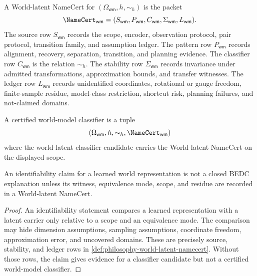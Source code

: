 \begin{definition}
\label{def:philosophy-world-latent-namecert}
A World-latent NameCert for $(\Omega_{\mathsf{wm}},h,\sim_h)$ is the
packet
$$
\NameCert_{\mathsf{wm}}
=
(S_{\mathsf{wm}},
P_{\mathsf{wm}},
C_{\mathsf{wm}},
\Sigma_{\mathsf{wm}},
L_{\mathsf{wm}}).
$$
The source row $S_{\mathsf{wm}}$ records the scope, encoder, observation
protocol, pair protocol, transition family, and assumption ledger. The
pattern row $P_{\mathsf{wm}}$ records alignment, recovery, separation,
transition, and planning evidence. The classifier row $C_{\mathsf{wm}}$
is the relation $\sim_h$. The stability row $\Sigma_{\mathsf{wm}}$
records invariance under admitted transformations, approximation bounds,
and transfer witnesses. The ledger row $L_{\mathsf{wm}}$ records
unidentified coordinates, rotational or gauge freedom, finite-sample
residue, model-class restriction, shortcut risk, planning failures, and
not-claimed domains.
\end{definition}

\begin{definition}
\label{def:philosophy-certified-world-model-classifier}
A certified world-model classifier is a tuple
$$
(\Omega_{\mathsf{wm}},h,\sim_h,\NameCert_{\mathsf{wm}})
$$
where the world-latent classifier candidate carries the World-latent
NameCert on the displayed scope.
\end{definition}

\begin{theorem}
\label{thm:philosophy-latent-recovery-certificate-data}
An identifiability claim for a learned world representation is not a
closed BEDC explanation unless its witness, equivalence mode, scope, and
residue are recorded in a World-latent NameCert.
\end{theorem}
\begin{proof}
An identifiability statement compares a learned representation with a
latent carrier only relative to a scope and an equivalence mode. The
comparison may hide dimension assumptions, sampling assumptions,
coordinate freedom, approximation error, and uncovered domains. These
are precisely source, stability, and ledger rows in
\autoref{def:philosophy-world-latent-namecert}. Without those rows, the
claim gives evidence for a classifier candidate but not a certified
world-model classifier.
\end{proof}


